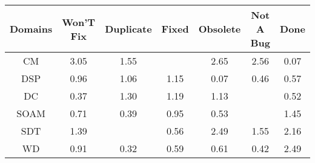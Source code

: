 \begin{tabular}{|c||c|c|c|c|c|c|}
\hline
Domains & Won'T Fix & Duplicate & Fixed & Obsolete & Not A Bug & Done \\ 
\hline
CM & \cellcolor[rgb]{0.53,0.66,0.42} 3.05 & \cellcolor[rgb]{0.8087016550337021,0.7920165734370168,0.42} 1.55 &  & \cellcolor[rgb]{0.6034285154554031,0.6947819283736121,0.42} 2.65 & \cellcolor[rgb]{0.6195963086711584,0.7024403567389699,0.42000000000000004} 2.56 & \cellcolor[rgb]{0.76,0.13,0.28} 0.07 \\ 
\hline
DSP & \cellcolor[rgb]{0.9031710660712168,0.8076763794037592,0.4136263283331356} 0.96 & \cellcolor[rgb]{0.8981094868604425,0.8343676516707358,0.42} 1.06 & \cellcolor[rgb]{0.8820451044789197,0.8267582073847514,0.42} 1.15 & \cellcolor[rgb]{0.7603415376682519,0.13161661162972554,0.28031876849036846} 0.07 & \cellcolor[rgb]{0.8222977047057944,0.4248758022740938,0.3381445243920749} 0.46 & \cellcolor[rgb]{0.8410708341589002,0.513735281685461,0.3556661118816402} 0.57 \\ 
\hline
DC & \cellcolor[rgb]{0.8077759177852148,0.3561393441833502,0.3245908565995339} 0.37 & \cellcolor[rgb]{0.8538278738355524,0.813392150764209,0.42} 1.30 & \cellcolor[rgb]{0.8739880265885183,0.8229416968050877,0.42} 1.19 & \cellcolor[rgb]{0.8856886764935743,0.8284841099180088,0.42} 1.13 &  & \cellcolor[rgb]{0.8320500978343333,0.47103712974917694,0.34724675797871096} 0.52 \\ 
\hline
SOAM & \cellcolor[rgb]{0.862541495551172,0.6153630789422142,0.3757053958477606} 0.71 & \cellcolor[rgb]{0.8106344533054595,0.3696697456458409,0.3272588230850954} 0.39 & \cellcolor[rgb]{0.901711579725717,0.8007681440350606,0.4122641410773359} 0.95 & \cellcolor[rgb]{0.8341888691861404,0.4811606474810644,0.349242944573731} 0.53 &  & \cellcolor[rgb]{0.8264317649689544,0.8004150465642415,0.42} 1.45 \\ 
\hline
SDT & \cellcolor[rgb]{0.8383070232436978,0.8060401689049095,0.42000000000000004} 1.39 &  & \cellcolor[rgb]{0.8392073102659019,0.5049146019252687,0.35392682291484173} 0.56 & \cellcolor[rgb]{0.6337430622940371,0.7091414505603333,0.41999999999999993} 2.49 & \cellcolor[rgb]{0.8086074264880114,0.7919719388627423,0.42} 1.55 & \cellcolor[rgb]{0.6946015147691188,0.7379691385748457,0.42} 2.16 \\ 
\hline
WD & \cellcolor[rgb]{0.8948490710146635,0.7682856028027398,0.40585913294701914} 0.91 & \cellcolor[rgb]{0.8003970212655691,0.3212125673236934,0.3177038865145311} 0.32 & \cellcolor[rgb]{0.8443766611268626,0.5293828626671491,0.35875155038507167} 0.59 & \cellcolor[rgb]{0.8471611958193817,0.5425629935450733,0.3613504494314229} 0.61 & \cellcolor[rgb]{0.8169499048877882,0.3995628831355306,0.3331532445619356} 0.42 & \cellcolor[rgb]{0.632955295284449,0.708768297766318,0.42} 2.49 \\ 
\hline
\end{tabular}
